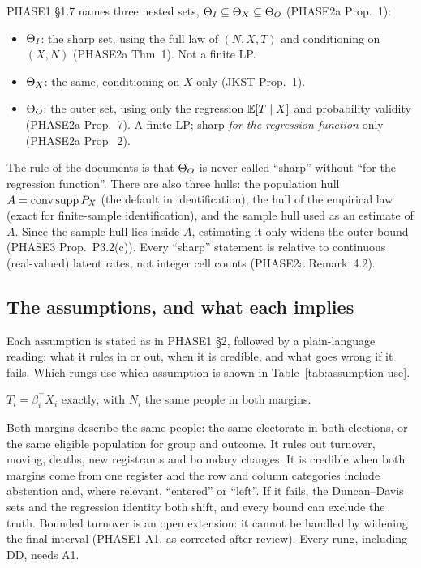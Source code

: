 PHASE1 \S1.7 names three nested sets, $\Theta_I\subseteq\Theta_X\subseteq\Theta_O$
(PHASE2a Prop.~1):
\begin{itemize}[nosep]
\item $\Theta_I$: the sharp set, using the full law of $(N,X,T)$ and conditioning
on $(X,N)$ (PHASE2a Thm~1). Not a finite LP.
\item $\Theta_X$: the same, conditioning on $X$ only (JKST Prop.~1).
\item $\Theta_O$: the outer set, using only the regression $\mathbb E[T\mid X]$ and
probability validity (PHASE2a Prop.~7). A finite LP; sharp \emph{for the
regression function} only (PHASE2a Prop.~2).
\end{itemize}
The rule of the documents is that $\Theta_O$ is never called ``sharp'' without
``for the regression function''. There are also three hulls: the population hull
$A=\operatorname{conv}\operatorname{supp} P_X$ (the default in identification), the hull of the empirical
law (exact for finite-sample identification), and the sample hull used as an
estimate of $A$. Since the sample hull lies inside $A$, estimating it only
widens the outer bound (PHASE3 Prop.~P3.2(c)). Every ``sharp'' statement is
relative to continuous (real-valued) latent rates, not integer cell counts
(PHASE2a Remark~4.2).

\subsection{The assumptions, and what each implies}\label{sec:assumptions}

Each assumption is stated as in PHASE1 \S2, followed by a plain-language
reading: what it rules in or out, when it is credible, and what goes wrong if it
fails. Which rungs use which assumption is shown in Table~\ref{tab:assumption-use}.

\begin{assumption}
$T_i=\beta_i^\top X_i$ exactly, with $N_i$ the same people in both margins.
\end{assumption}
\begin{plain}
Both margins describe the same people: the same electorate in both elections,
or the same eligible population for group and outcome. It rules out turnover,
moving, deaths, new registrants and boundary changes. It is credible when both
margins come from one register and the row and column categories include
abstention and, where relevant, ``entered'' or ``left''. If it fails, the
Duncan--Davis sets and the regression identity both shift, and every bound can
exclude the truth. Bounded turnover is an open extension: it cannot be handled
by widening the final interval (PHASE1 A1, as corrected after review). Every
rung, including DD, needs A1.
\end{plain}

